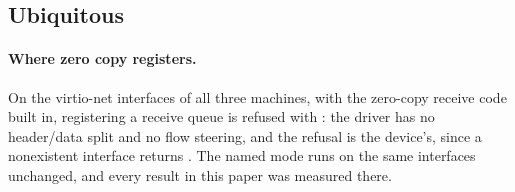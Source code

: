 \subsection{Ubiquitous}
\label{sec:eval:ubiquitous}

\paragraph{Where zero copy registers.} 
On the virtio-net interfaces of all three machines, with the zero-copy receive code built in,
registering a receive queue is refused with : the driver has no header/data
split and no flow steering, and the refusal is the device's, since a nonexistent interface
returns . The named mode runs on the same interfaces unchanged, and every result in
this paper was measured there. %

